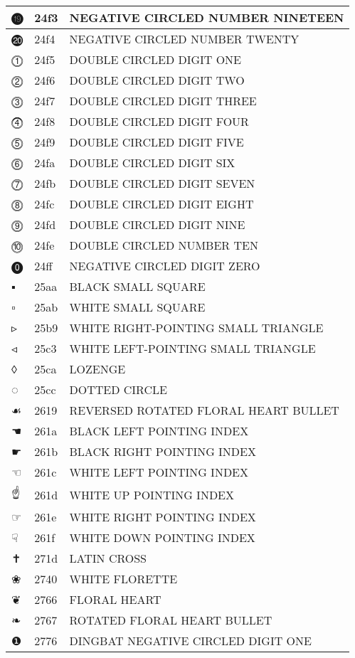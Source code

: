 \documentclass[12pt,letterpaper,openany]{book}
\begin{document}
\begin{center}
\begin{supertabular}{|m{0.25in}|m{0.5in}|m{4in}|}
⓳ & 24f3 & NEGATIVE CIRCLED NUMBER NINETEEN\\\hline
⓴ & 24f4 & NEGATIVE CIRCLED NUMBER TWENTY\\\hline
⓵ & 24f5 & DOUBLE CIRCLED DIGIT ONE\\\hline
⓶ & 24f6 & DOUBLE CIRCLED DIGIT TWO\\\hline
⓷ & 24f7 & DOUBLE CIRCLED DIGIT THREE\\\hline
⓸ & 24f8 & DOUBLE CIRCLED DIGIT FOUR\\\hline
⓹ & 24f9 & DOUBLE CIRCLED DIGIT FIVE\\\hline
⓺ & 24fa & DOUBLE CIRCLED DIGIT SIX\\\hline
⓻ & 24fb & DOUBLE CIRCLED DIGIT SEVEN\\\hline
⓼ & 24fc & DOUBLE CIRCLED DIGIT EIGHT\\\hline
⓽ & 24fd & DOUBLE CIRCLED DIGIT NINE\\\hline
⓾ & 24fe & DOUBLE CIRCLED NUMBER TEN\\\hline
⓿ & 24ff & NEGATIVE CIRCLED DIGIT ZERO\\\hline
▪ & 25aa & BLACK SMALL SQUARE\\\hline
▫ & 25ab & WHITE SMALL SQUARE\\\hline
▹ & 25b9 & WHITE RIGHT-POINTING SMALL TRIANGLE\\\hline
◃ & 25c3 & WHITE LEFT-POINTING SMALL TRIANGLE\\\hline
◊ & 25ca & LOZENGE\\\hline
◌ & 25cc & DOTTED CIRCLE\\\hline
☙ & 2619 & REVERSED ROTATED FLORAL HEART BULLET\\\hline
☚ & 261a & BLACK LEFT POINTING INDEX\\\hline
☛ & 261b & BLACK RIGHT POINTING INDEX\\\hline
☜ & 261c & WHITE LEFT POINTING INDEX\\\hline
☝ & 261d & WHITE UP POINTING INDEX\\\hline
☞ & 261e & WHITE RIGHT POINTING INDEX\\\hline
☟ & 261f & WHITE DOWN POINTING INDEX\\\hline
✝ & 271d & LATIN CROSS\\\hline
❀ & 2740 & WHITE FLORETTE\\\hline
❦ & 2766 & FLORAL HEART\\\hline
❧ & 2767 & ROTATED FLORAL HEART BULLET\\\hline
❶ & 2776 & DINGBAT NEGATIVE CIRCLED DIGIT ONE\\\hline

\end{supertabular}
\end{center}
\end{document}
